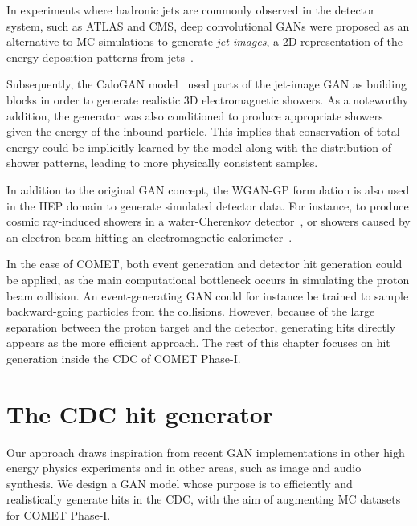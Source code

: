 In experiments where hadronic jets are commonly observed in the detector system, such as ATLAS and CMS, deep convolutional GANs were proposed as an alternative to MC simulations to generate \emph{jet images}, a 2D representation of the energy deposition patterns from jets~\cite{deOliveira2017b}. 

Subsequently, the {\sc CaloGAN} model~\cite{paganini_calogan_2018} used parts of the jet-image GAN as building blocks in order to generate realistic 3D electromagnetic showers. As a noteworthy addition, the generator was also conditioned to produce appropriate showers given the energy of the inbound particle. This implies that conservation of total energy could be implicitly learned by the model along with the distribution of shower patterns, leading to more physically consistent samples.


In addition to the original GAN concept, the WGAN-GP formulation is also used in the HEP domain to generate simulated detector data. For instance, to produce cosmic ray-induced showers in a water-Cherenkov detector~\cite{Erdmann2018}, or showers caused by an electron beam hitting an electromagnetic calorimeter~\cite{Erdmann2019}.

In the case of COMET, both event generation and detector hit generation could be applied, as the main computational bottleneck occurs in simulating the proton beam collision. An event-generating GAN could for instance be trained to sample backward-going particles from the collisions. However, because of the large separation between the proton target and the detector, generating hits directly appears as the more efficient approach.
The rest of this chapter focuses on hit generation inside the CDC of COMET Phase-I.





\section{The CDC hit generator}
Our approach draws inspiration from recent GAN implementations in other high energy physics experiments and in other areas, such as image and audio synthesis. We design a GAN model whose purpose is to efficiently and realistically generate hits in the CDC, with the aim of augmenting MC datasets for COMET Phase-I. 

